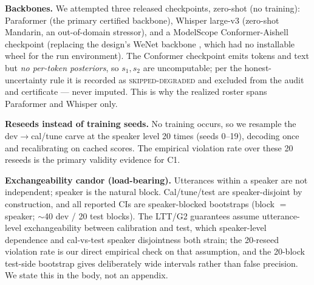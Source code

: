 \documentclass[11pt]{article}
\begin{document}
\textbf{Backbones.} We attempted three released checkpoints, zero-shot (no training):
Paraformer \citep{gao2022paraformer,gao2023funasr} (the primary certified backbone),
Whisper large-v3 \citep{radford2023whisper} (zero-shot Mandarin, an out-of-domain
stressor), and a ModelScope Conformer-Aishell checkpoint (replacing the design's
WeNet backbone \citep{yao2021wenet}, which had no installable wheel for the run environment). The Conformer
checkpoint emits tokens and text but \emph{no per-token posteriors}, so $s_1,s_2$ are
uncomputable; per the honest-uncertainty rule it is recorded as
\textsc{skipped-degraded} and excluded from the audit and certificate --- never
imputed. This is why the realized roster spans Paraformer and Whisper only.

\textbf{Reseeds instead of training seeds.} No training occurs, so we resample the
dev$\to$cal/tune carve at the speaker level 20 times (seeds 0--19), decoding once and
recalibrating on cached scores. The empirical violation rate over these 20 reseeds is
the primary validity evidence for C1.

\textbf{Exchangeability candor (load-bearing).} Utterances within a speaker are not
independent; speaker is the natural block. Cal/tune/test are speaker-disjoint by
construction, and all reported CIs are speaker-blocked bootstraps (block $=$ speaker;
$\sim$40 dev / 20 test blocks). The LTT/G2 guarantees assume utterance-level
exchangeability between calibration and test, which speaker-level dependence and
cal-vs-test speaker disjointness both strain; the 20-reseed violation rate is our
direct empirical check on that assumption, and the 20-block test-side bootstrap gives
deliberately wide intervals rather than false precision. We state this in the body,
not an appendix.
\end{document}
